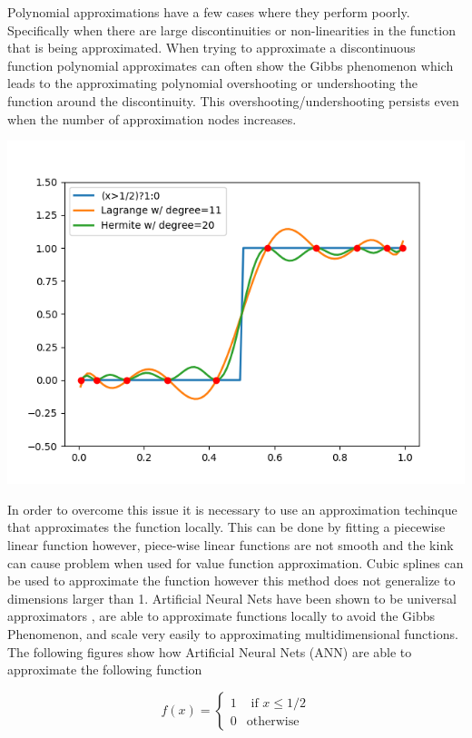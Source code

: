 \documentclass[12pt]{article}
\begin{document}
Polynomial approximations have a few cases where they perform poorly. Specifically when there are large discontinuities or non-linearities in the function that is being approximated. When trying to approximate a discontinuous function polynomial approximates can often show the Gibbs phenomenon which leads to the approximating polynomial overshooting or undershooting the function around the discontinuity. This overshooting/undershooting persists even when the number of approximation nodes increases.

\includegraphics{plot_Cheb_Ind_Func}

In order to overcome this issue it is necessary to use an approximation techinque that approximates the function locally. This can be done by fitting a piecewise linear function however, piece-wise linear functions are not smooth and the kink can cause problem when used for value function approximation. Cubic splines can be used to approximate the function however this method does not generalize to dimensions larger than 1. Artificial Neural Nets have been shown to be universal approximators %
, are able to approximate functions locally to avoid the Gibbs Phenomenon, and scale very easily to approximating multidimensional functions. The following figures show how Artificial Neural Nets (ANN) are able to approximate the following function

\begin{equation*}
  f(x)=\begin{cases}
    1 & \text{ if } x\leq1/2\\
    0 & \text{otherwise}
  \end{cases}
\end{equation*}
\end{document}
